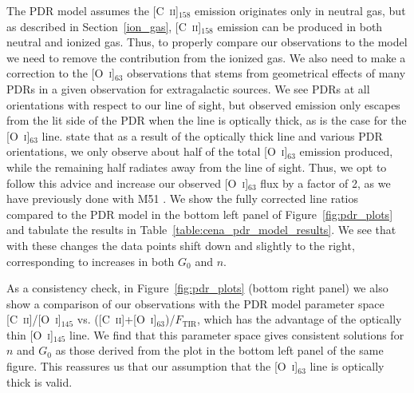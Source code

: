 \documentclass[preprint2]{aastex}
\begin{document}
The PDR model assumes the [C~\textsc{ii}]$_{158}$ emission originates only in neutral gas, but as described in Section~\ref{ion_gas}, [C~\textsc{ii}]$_{158}$ emission can be produced in both neutral and ionized gas.  Thus, to properly compare our observations to the model we need to remove the contribution from the ionized gas.  We also need to make a correction to the [O~\textsc{i}]$_{63}$ observations that stems from geometrical effects of many PDRs in a given observation for extragalactic sources.  We see PDRs at all orientations with respect to our line of sight, but observed emission only escapes from the lit side of the PDR when the line is optically thick, as is the case for the [O~\textsc{i}]$_{63}$ line.  \citet{1999ApJ...527..795K} state that as a result of the optically thick line and various PDR orientations, we only observe about half of the total [O~\textsc{i}]$_{63}$ emission produced, while the remaining half radiates away from the line of sight.  Thus, we opt to follow this advice and increase our observed [O~\textsc{i}]$_{63}$ flux by a factor of 2, as we have previously done with M51 \citep{parkin_2013}.  We show the fully corrected line ratios compared to the PDR model in the bottom left panel of Figure~\ref{fig:pdr_plots} and tabulate the results in Table~\ref{table:cena_pdr_model_results}.  We see that with these changes the data points shift down and slightly to the right, corresponding to increases in both $G_{0}$ and $n$.

As a consistency check, in Figure~\ref{fig:pdr_plots} (bottom right panel) we also show a comparison of our observations with the PDR model parameter space [C~\textsc{ii}]/[O~\textsc{i}]$_{145}$ vs. ([C~\textsc{ii}]+[O~\textsc{i}]$_{63}$)/$F_{\mathrm{TIR}}$, which has the advantage of the optically thin [O~\textsc{i}]$_{145}$ line.  We find that this parameter space gives consistent solutions for $n$ and $G_{0}$ as those derived from the plot in the bottom left panel of the same figure.  This reassures us that our assumption that the [O~\textsc{i}]$_{63}$ line is optically thick is valid.
\end{document}
